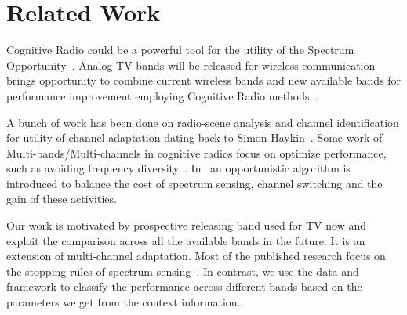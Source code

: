 \section{Related Work}
\label{sec:related}

Cognitive Radio could be a powerful tool for the utility of the Spectrum Opportunity~\cite{haykin2005cognitive}.
Analog TV bands will be released for wireless communication brings opportunity to combine current wireless bands and new available bands for performance improvement employing Cognitive Radio methods~\cite{MOAR}. 


A bunch of work has been done on radio-scene analysis and channel identification for utility of channel adaptation dating back to Simon Haykin~\cite{haykin2005cognitive}.
Some work of Multi-bands/Multi-channels in
cognitive radios focus on optimize performance, such as avoiding frequency diversity~\cite{rahul2009frequency}. 
In~\cite{OAR} an opportunistic algorithm is introduced to balance the cost of spectrum sensing, channel switching and the gain of these activities.


Our work is motivated by prospective releasing band used for TV now and exploit the comparison across all the available bands in the future. 
It is an extension of multi-channel adaptation. 
Most of the published research focus on the stopping rules of spectrum sensing~\cite{sabharwal2007opportunistic, OAR}. In contrast, we use the data and framework to classify the performance across different bands based on the parameters we get from the context information.

